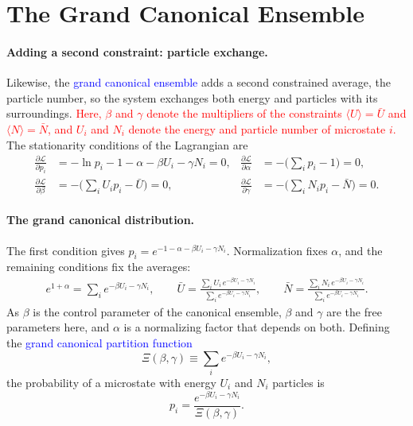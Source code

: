 \section{The Grand Canonical Ensemble}

\paragraph{Adding a second constraint: particle exchange.}
Likewise, the \textcolor{blue}{grand canonical ensemble} adds a second
constrained average, the particle number, so the system exchanges both energy
and particles with its surroundings.
\textcolor{red}{Here, $\beta$ and $\gamma$ denote the multipliers of the
constraints $\langle U\rangle=\bar U$ and $\langle N\rangle=\bar N$, and
$U_i$ and $N_i$ denote the energy and particle number of microstate $i$.}
The stationarity conditions of the Lagrangian are
\begin{align*}
    \frac{\partial\mathcal{L}}{\partial p_i}
    &= -\ln p_i-1-\alpha-\beta U_i-\gamma N_i=0,
    &\frac{\partial\mathcal{L}}{\partial\alpha}
    &= -\Big(\sum_i p_i-1\Big)=0,\\
    \frac{\partial\mathcal{L}}{\partial\beta}
    &= -\Big(\sum_i U_i p_i-\bar U\Big)=0,
    &\frac{\partial\mathcal{L}}{\partial\gamma}
    &= -\Big(\sum_i N_i p_i-\bar N\Big)=0.
\end{align*}

\paragraph{The grand canonical distribution.}
The first condition gives $p_i=e^{-1-\alpha-\beta U_i-\gamma N_i}$.
Normalization fixes $\alpha$, and the remaining conditions fix the averages:
\begin{align*}
    e^{1+\alpha}=\sum_i e^{-\beta U_i-\gamma N_i},
    \qquad
    \bar U=\frac{\sum_i U_i\,e^{-\beta U_i-\gamma N_i}}{\sum_i e^{-\beta U_i-\gamma N_i}},
    \qquad
    \bar N=\frac{\sum_i N_i\,e^{-\beta U_i-\gamma N_i}}{\sum_i e^{-\beta U_i-\gamma N_i}}.
\end{align*}
As $\beta$ is the control parameter of the canonical ensemble, $\beta$ and
$\gamma$ are the free parameters here, and $\alpha$ is a normalizing factor
that depends on both. Defining the \textcolor{blue}{grand canonical partition
function}
\begin{equation}
    \boxed{\Xi(\beta,\gamma)\equiv\sum_i e^{-\beta U_i-\gamma N_i},}
\end{equation}
the probability of a microstate with energy $U_i$ and $N_i$ particles is
\begin{equation}
    \boxed{p_i=\frac{e^{-\beta U_i-\gamma N_i}}{\Xi(\beta,\gamma)}.}
\end{equation}

